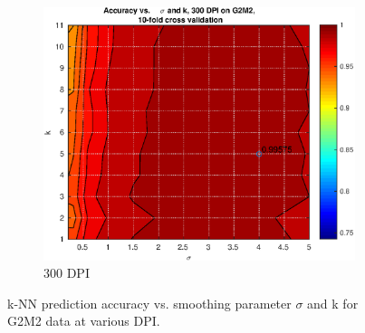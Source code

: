 \begin{figure}
\begin{subfigure}{0.32\textwidth}
		\includegraphics[width = \textwidth]{img/knn-AccVsKVsSigma-G2M2-dpi300-cv10}
		\caption{300 DPI}
	\end{subfigure}
	\caption[k-NN prediction accuracy vs. smoothing parameter $\sigma$
			and k at various DPI.]{
		k-NN prediction accuracy vs. smoothing parameter $\sigma$
		and k for G2M2 data at various DPI.
		}
	\label{fig:knn-AccVsKVsSigma-G2M2}
\end{figure}